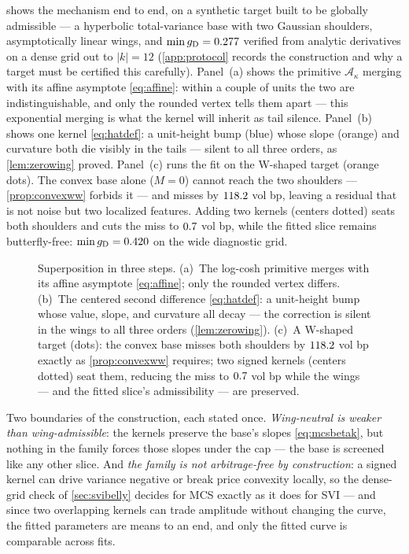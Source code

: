  shows the mechanism end to end, on a synthetic
target built to be globally admissible --- a hyperbolic total-variance
base with two Gaussian shoulders, asymptotically linear wings, and
$\min g_{\rm D}=0.277$ verified from analytic derivatives
on a dense grid out to $|k|=12$ (\cref{app:protocol} records the
construction and why a target must be certified this carefully).
Panel~(a) shows the primitive $\mathcal{A}_\kappa$ merging with its
affine asymptote \eqref{eq:affine}: within a couple of units the two
are indistinguishable, and only the rounded vertex tells them apart
--- this exponential merging is what the kernel will inherit as tail
silence.  Panel~(b) shows one kernel \eqref{eq:hatdef}: a unit-height
bump (blue) whose slope (orange) and curvature both die visibly in the
tails --- silent to all three orders, as \cref{lem:zerowing} proved.
Panel~(c) runs the fit on the W-shaped target (orange dots).  The
convex base alone ($M=0$) cannot reach the two shoulders ---
\cref{prop:convexww} forbids it --- and misses by
$118.2$ vol bp, leaving a residual that is not noise but
two localized features.  Adding two kernels (centers dotted) seats
both shoulders and cuts the miss to $0.7$ vol bp,
while the fitted slice remains butterfly-free:
$\min g_{\rm D}=0.420$ on the wide diagnostic grid.

\begin{figure}[htbp]
\centering
{}
\caption{Superposition in three steps.  (a)~The log-cosh primitive
merges with its affine asymptote \eqref{eq:affine}; only the rounded
vertex differs.  (b)~The centered second difference \eqref{eq:hatdef}:
a unit-height bump whose value, slope, and curvature all decay --- the
correction is silent in the wings to all three orders
(\cref{lem:zerowing}).  (c)~A W-shaped target (dots): the convex base
misses both shoulders by $118.2$ vol bp exactly as
\cref{prop:convexww} requires; two signed kernels (centers dotted)
seat them, reducing the miss to $0.7$ vol bp while the
wings --- and the fitted slice's admissibility --- are preserved.}
\label{fig:mcsmech}
\end{figure}

Two boundaries of the construction, each stated once.
\emph{Wing-neutral is weaker than wing-admissible}: the kernels
preserve the base's slopes \eqref{eq:mcsbetak}, but nothing in the
family forces those slopes under the cap --- the base is screened like
any other slice.  And \emph{the family is not arbitrage-free by
construction}: a signed kernel can drive variance negative or break
price convexity locally, so the dense-grid check of \cref{sec:svibelly}
decides for MCS exactly as it does for SVI --- and since two
overlapping kernels can trade amplitude without changing the curve,
the fitted parameters are means to an end, and only the fitted curve
is comparable across fits.

